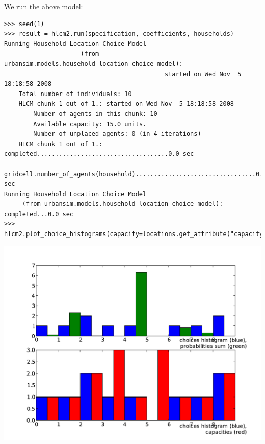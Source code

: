 We run the above model:
\begin{verbatim}
>>> seed(1)
>>> result = hlcm2.run(specification, coefficients, households)
Running Household Location Choice Model 
                     (from urbansim.models.household_location_choice_model): 
                                            started on Wed Nov  5 18:18:58 2008
    Total number of individuals: 10
    HLCM chunk 1 out of 1.: started on Wed Nov  5 18:18:58 2008
        Number of agents in this chunk: 10
        Available capacity: 15.0 units.
        Number of unplaced agents: 0 (in 4 iterations)
    HLCM chunk 1 out of 1.: completed....................................0.0 sec
    gridcell.number_of_agents(household).................................0.0 sec
Running Household Location Choice Model 
     (from urbansim.models.household_location_choice_model): completed...0.0 sec
>>> hlcm2.plot_choice_histograms(capacity=locations.get_attribute("capacity"))
\end{verbatim}
\begin{center}
\includegraphics[scale=0.5, angle=0]{images/hlcm2hist.pdf}
\end{center}
